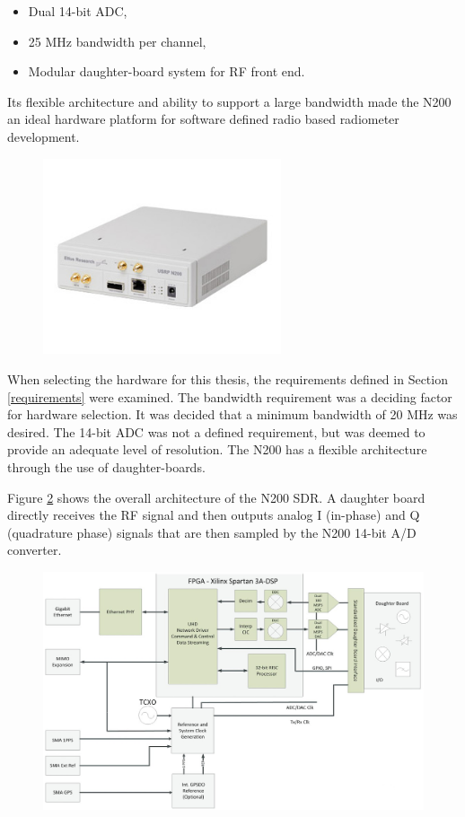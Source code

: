\begin{itemize}
\item Dual 14-bit ADC,
\item 25 MHz bandwidth per channel,
\item Modular daughter-board system for RF front end.
\end{itemize}

Its flexible architecture and ability to support a large bandwidth made the N200 an ideal hardware platform for software defined radio based radiometer development.

{\begin{figure}[h!tb] 
\centering
\includegraphics[width=7cm]{Images/n200}
\label{N200}
\end{figure}
}

When selecting the hardware for this thesis, the requirements defined in Section \ref{requirements} were examined.  The bandwidth requirement was a deciding factor for hardware selection.  It was decided that a minimum bandwidth of 20 MHz was desired.  The 14-bit ADC was not a defined requirement, but was deemed to provide an adequate level of resolution.  The N200 has a flexible architecture through the use of daughter-boards.  

Figure \ref{N200_block} shows the overall architecture of the N200 SDR.  A daughter board directly receives the RF signal and then outputs analog I (in-phase) and Q (quadrature phase) signals that are then sampled by the N200 14-bit  A/D converter.

{\begin{figure}[h!tb] 
\centering
\includegraphics[width=14cm]{Images/n200_block_edited}
\label{N200_block}
\end{figure}
}

